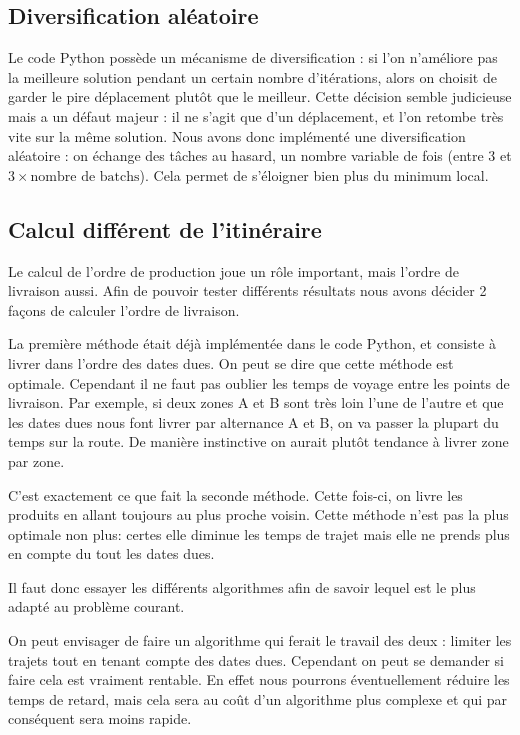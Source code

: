\documentclass[hideweeklyreports]{polytech/polytech}
\begin{document}
			\subsection{\label{diversificationAleatoire}Diversification aléatoire}
				Le code Python possède un mécanisme de diversification : si l'on n'améliore pas la meilleure solution pendant un certain nombre d'itérations, alors on choisit de garder le pire déplacement plutôt que le meilleur. Cette décision semble judicieuse mais a un défaut majeur : il ne s'agit que d'un déplacement, et l'on retombe très vite sur la même solution. Nous avons donc implémenté une diversification aléatoire : on échange des tâches au hasard, un nombre variable de fois (entre 3 et $3 \times \text{nombre de batchs}$). Cela permet de s'éloigner bien plus du minimum local.
				
			\subsection{\label{deliveries}Calcul différent de l'itinéraire}
				Le calcul de l'ordre de production joue un rôle important, mais l'ordre de livraison aussi. Afin de pouvoir tester différents résultats nous avons décider 2 façons de calculer l'ordre de livraison.
				
				La première méthode était déjà implémentée dans le code Python, et consiste à livrer dans l'ordre des dates dues. On peut se dire que cette méthode est optimale. Cependant il ne faut pas oublier les temps de voyage entre les points de livraison. Par exemple, si deux zones A et B sont très loin l'une de l'autre et que les dates dues nous font livrer par alternance A et B, on va passer la plupart du temps sur la route. De manière instinctive on aurait plutôt tendance à livrer zone par zone.
				
				C'est exactement ce que fait la seconde méthode. Cette fois-ci, on livre les produits en allant toujours au plus proche voisin. Cette méthode n'est pas la plus optimale non plus: certes elle diminue les temps de trajet mais elle ne prends plus en compte du tout les dates dues.
				
				Il faut donc essayer les différents algorithmes afin de savoir lequel est le plus adapté au problème courant.
				
				On peut envisager de faire un algorithme qui ferait le travail des deux : limiter les trajets tout en tenant compte des dates dues. Cependant on peut se demander si faire cela est vraiment rentable. En effet nous pourrons éventuellement réduire les temps de retard, mais cela sera au coût d'un algorithme plus complexe et qui par conséquent sera moins rapide.
				
\end{document}
